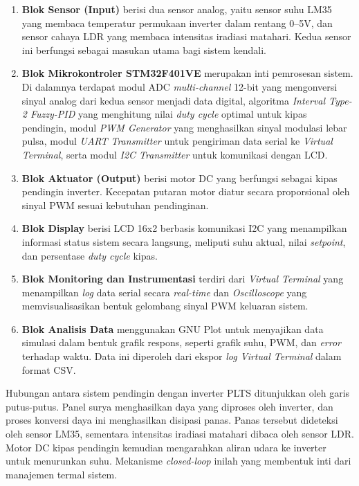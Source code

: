 \documentclass[11pt,a4paper]{article}
\begin{document}
\begin{enumerate}
    \item \textbf{Blok Sensor (Input)} berisi dua sensor analog, yaitu sensor suhu LM35 yang membaca temperatur permukaan inverter dalam rentang 0--5V, dan sensor cahaya LDR yang membaca intensitas iradiasi matahari. Kedua sensor ini berfungsi sebagai masukan utama bagi sistem kendali.
    
    \item \textbf{Blok Mikrokontroler STM32F401VE} merupakan inti pemrosesan sistem. Di dalamnya terdapat modul ADC \textit{multi-channel} 12-bit yang mengonversi sinyal analog dari kedua sensor menjadi data digital, algoritma \textit{Interval Type-2 Fuzzy-PID} yang menghitung nilai \textit{duty cycle} optimal untuk kipas pendingin, modul \textit{PWM Generator} yang menghasilkan sinyal modulasi lebar pulsa, modul \textit{UART Transmitter} untuk pengiriman data serial ke \textit{Virtual Terminal}, serta modul \textit{I2C Transmitter} untuk komunikasi dengan LCD.
    
    \item \textbf{Blok Aktuator (Output)} berisi motor DC yang berfungsi sebagai kipas pendingin inverter. Kecepatan putaran motor diatur secara proporsional oleh sinyal PWM sesuai kebutuhan pendinginan.
    
    \item \textbf{Blok Display} berisi LCD 16x2 berbasis komunikasi I2C yang menampilkan informasi status sistem secara langsung, meliputi suhu aktual, nilai \textit{setpoint}, dan persentase \textit{duty cycle} kipas.
    
    \item \textbf{Blok Monitoring dan Instrumentasi} terdiri dari \textit{Virtual Terminal} yang menampilkan \textit{log} data serial secara \textit{real-time} dan \textit{Oscilloscope} yang memvisualisasikan bentuk gelombang sinyal PWM keluaran sistem.
    
    \item \textbf{Blok Analisis Data} menggunakan GNU Plot untuk menyajikan data simulasi dalam bentuk grafik respons, seperti grafik suhu, PWM, dan \textit{error} terhadap waktu. Data ini diperoleh dari ekspor \textit{log Virtual Terminal} dalam format CSV.
\end{enumerate}

Hubungan antara sistem pendingin dengan inverter PLTS ditunjukkan oleh garis putus-putus. Panel surya menghasilkan daya yang diproses oleh inverter, dan proses konversi daya ini menghasilkan disipasi panas. Panas tersebut dideteksi oleh sensor LM35, sementara intensitas iradiasi matahari dibaca oleh sensor LDR. Motor DC kipas pendingin kemudian mengarahkan aliran udara ke inverter untuk menurunkan suhu. Mekanisme \textit{closed-loop} inilah yang membentuk inti dari manajemen termal sistem.
\end{document}
